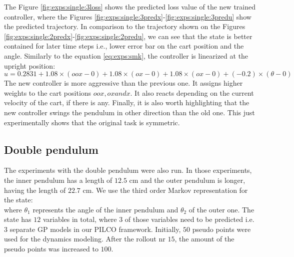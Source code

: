 \noindent The Figure \ref{fig:exps:single:3loss} shows the predicted loss value of the new trained controller, where the Figures \ref{fig:exps:single:3predx}-\ref{fig:exps:single:3predu} show the predicted trajectory. In comparison to the trajectory shown on the Figures \ref{fig:exps:single:2predx}-\ref{fig:exps:single:2predu}, we can see that the state is better contained for later time steps i.e., lower error bar on the cart position and the angle. Similarly to the equation \ref{eq:exps:smk}, the controller is linearized at the upright position:
\begin{equation}
u=0.2831 + 1.08 \times (oox-0) + 1.08 \times (ox-0) + 1.08 \times (ox-0) + (-0.2) \times (\theta-0) \nonumber
\end{equation}
The new controller is more aggressive than the previous one. It assigns higher weights to the cart positions $oox, ox and x$. It also reacts depending on the current velocity of the cart, if there is any. Finally, it is also worth highlighting that the new controller swings the pendulum in other direction than the old one. This just experimentally shows that the original task is symmetric.

\subsection{Double pendulum}
\label{s:exps:double}
The experiments with the double pendulum were also run. In those experiments, the inner pendulum has a length of $12.5$ cm and the outer pendulum is longer, having the length of $22.7$ cm. We use the third order Markov representation for the state:
\begin{equation}
[ooou, oox, oo\theta_{1}, oo\theta_{2}, oou, ox, o\theta_{1}, o\theta_{2}, ou, x, \theta_{1}, \theta_{2}, u] \nonumber
\end{equation}
where $\theta_{1}$ represents the angle of the inner pendulum and $\theta_{2}$ of the outer one. The state has $12$ variables in total, where $3$ of those variables need to be predicted i.e. 3 separate GP models in our PILCO framework. Initially, $50$ pseudo points were used for the dynamics modeling. After the rollout nr $15$, the amount of the pseudo points was increased to $100$.

